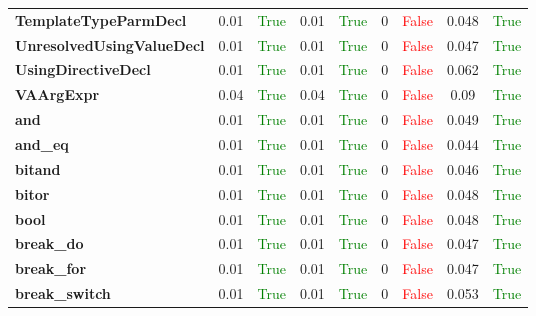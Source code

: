 \documentclass{article}
\begin{document}
\begin{xltabular}{\textwidth}{lcccccccc}
\textbf{{\fontsize{10}{12}\selectfont TemplateTypeParmDecl}}& 0.01&\textcolor{green}{True}& 0.01&\textcolor{green}{True}& 0&\textcolor{red}{False}& 0.048&\textcolor{green}{True} \\[0.5ex]
\textbf{{\fontsize{10}{12}\selectfont UnresolvedUsingValueDecl}}& 0.01&\textcolor{green}{True}& 0.01&\textcolor{green}{True}& 0&\textcolor{red}{False}& 0.047&\textcolor{green}{True} \\[0.5ex]
\textbf{{\fontsize{10}{12}\selectfont UsingDirectiveDecl}}& 0.01&\textcolor{green}{True}& 0.01&\textcolor{green}{True}& 0&\textcolor{red}{False}& 0.062&\textcolor{green}{True} \\[0.5ex]
\textbf{{\fontsize{10}{12}\selectfont VAArgExpr}}& 0.04&\textcolor{green}{True}& 0.04&\textcolor{green}{True}& 0&\textcolor{red}{False}& 0.09&\textcolor{green}{True} \\[0.5ex]
\textbf{{\fontsize{10}{12}\selectfont and}}& 0.01&\textcolor{green}{True}& 0.01&\textcolor{green}{True}& 0&\textcolor{red}{False}& 0.049&\textcolor{green}{True} \\[0.5ex]
\textbf{{\fontsize{10}{12}\selectfont and\_eq}}& 0.01&\textcolor{green}{True}& 0.01&\textcolor{green}{True}& 0&\textcolor{red}{False}& 0.044&\textcolor{green}{True} \\[0.5ex]
\textbf{{\fontsize{10}{12}\selectfont bitand}}& 0.01&\textcolor{green}{True}& 0.01&\textcolor{green}{True}& 0&\textcolor{red}{False}& 0.046&\textcolor{green}{True} \\[0.5ex]
\textbf{{\fontsize{10}{12}\selectfont bitor}}& 0.01&\textcolor{green}{True}& 0.01&\textcolor{green}{True}& 0&\textcolor{red}{False}& 0.048&\textcolor{green}{True} \\[0.5ex]
\textbf{{\fontsize{10}{12}\selectfont bool}}& 0.01&\textcolor{green}{True}& 0.01&\textcolor{green}{True}& 0&\textcolor{red}{False}& 0.048&\textcolor{green}{True} \\[0.5ex]
\textbf{{\fontsize{10}{12}\selectfont break\_do}}& 0.01&\textcolor{green}{True}& 0.01&\textcolor{green}{True}& 0&\textcolor{red}{False}& 0.047&\textcolor{green}{True} \\[0.5ex]
\textbf{{\fontsize{10}{12}\selectfont break\_for}}& 0.01&\textcolor{green}{True}& 0.01&\textcolor{green}{True}& 0&\textcolor{red}{False}& 0.047&\textcolor{green}{True} \\[0.5ex]
\textbf{{\fontsize{10}{12}\selectfont break\_switch}}& 0.01&\textcolor{green}{True}& 0.01&\textcolor{green}{True}& 0&\textcolor{red}{False}& 0.053&\textcolor{green}{True} \\[0.5ex]

\end{xltabular}
\end{document}
